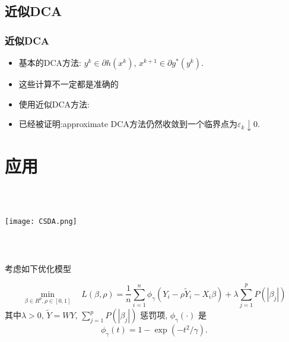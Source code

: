 \documentclass{beamer}
\begin{document}
\subsection{近似DCA}
\begin{frame}
\frametitle{近似DCA}

\begin{itemize}
  \item 基本的DCA方法:
  $y^{k} \in \partial h\left(x^{k}\right)$,
  $x^{k+1} \in \partial g^{*}\left(y^{k}\right) .$

\item
{}
 这些计算不一定都是准确的

  \item {}
使用近似DCA方法:
 \item
已经被证明:approximate DCA方法仍然收敛到一个临界点为$\varepsilon_{k} \downarrow 0$.

\end{itemize}

\end{frame}



\section{应用}
\begin{frame}
  \frametitle{\secno\,\secname}
\texttt{[image: CSDA.png]}

 \end{frame}


\begin{frame}
  \frametitle{\secno\,\secname}

考虑如下优化模型

\begin{equation}\label{eq-obj-L}
\min\limits_{\beta\in R^p,\rho\in [0,1]}^{} \quad L(\beta,\rho)=
  \frac{1}{n}\sum_{i=1}^n\phi_{\gamma}(Y_i - \rho \tilde{Y}_i - X_i\beta) + \lambda\sum_{j=1}^pP(|\beta_j|) %
\end{equation}
其中$\lambda >0$, $\tilde{Y} = WY$, $\sum_{j=1}^p P(|\beta_j|)$ 惩罚项,
 $\phi_\gamma(\cdot)$ 是 
 $$\phi_\gamma(t)=1-\exp(-t^2/\gamma).
 $$

\end{frame}
\end{document}
